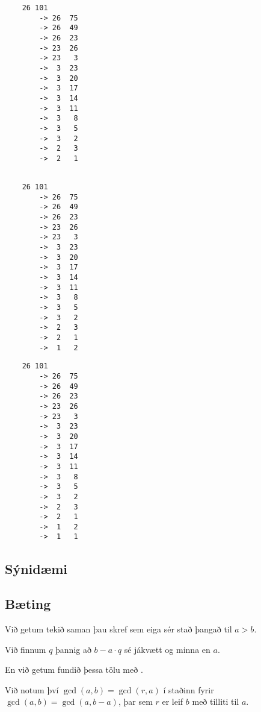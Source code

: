 { \begin{verbatim}
    26 101
        -> 26  75
        -> 26  49
        -> 26  23
        -> 23  26
        -> 23   3
        ->  3  23
        ->  3  20
        ->  3  17
        ->  3  14
        ->  3  11
        ->  3   8
        ->  3   5
        ->  3   2
        ->  2   3
        ->  2   1


        \end{verbatim}}
{ \begin{verbatim}
    26 101
        -> 26  75
        -> 26  49
        -> 26  23
        -> 23  26
        -> 23   3
        ->  3  23
        ->  3  20
        ->  3  17
        ->  3  14
        ->  3  11
        ->  3   8
        ->  3   5
        ->  3   2
        ->  2   3
        ->  2   1
        ->  1   2

        \end{verbatim}}
{ \begin{verbatim}
    26 101
        -> 26  75
        -> 26  49
        -> 26  23
        -> 23  26
        -> 23   3
        ->  3  23
        ->  3  20
        ->  3  17
        ->  3  14
        ->  3  11
        ->  3   8
        ->  3   5
        ->  3   2
        ->  2   3
        ->  2   1
        ->  1   2
        ->  1   1
        \end{verbatim}}

\subsection{Sýnidæmi}
{
}

\subsection{Bæting}
{
    {
        \item<1-> Við getum tekið saman þau skref sem eiga sér stað þangað til $a > b$.
        \item<2-> Við finnum $q$ þannig að $b - a \cdot q$ sé jákvætt og minna en $a$.
        \item<3-> En við getum fundið þessa tölu með .
        \item<5-> Við notum því $\gcd(a, b) = \gcd(r, a)$ í staðinn fyrir $\gcd(a, b) = \gcd(a, b - a)$, þar sem $r$ er leif $b$ með tilliti til $a$.
    }
}

